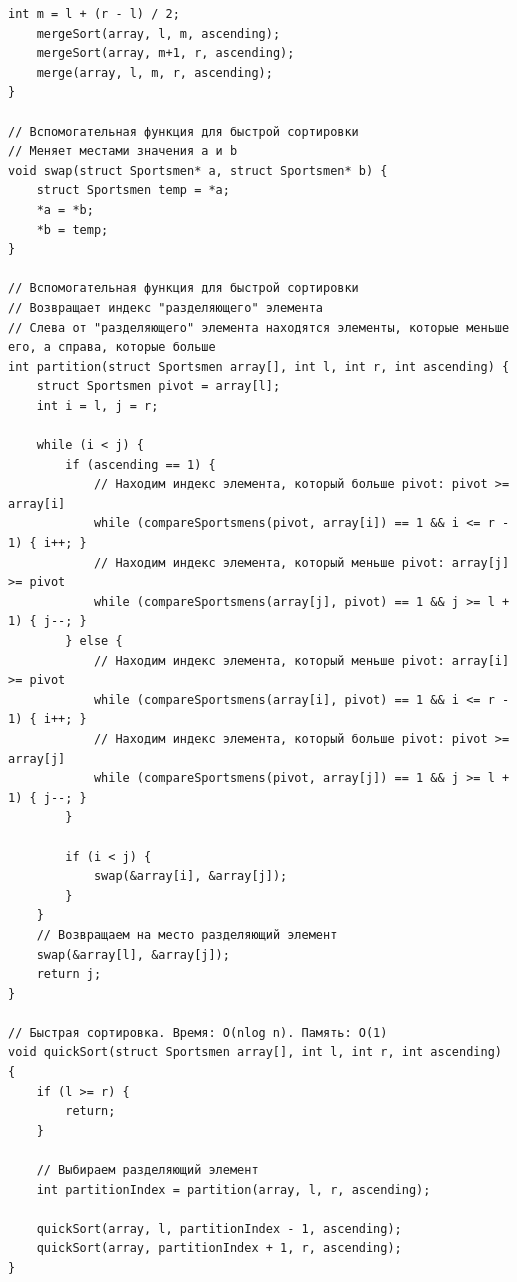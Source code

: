 \documentclass[12pt]{article}
\begin{document}
\begin{lstlisting}[label=sorting.c, caption=sorting.c]
    int m = l + (r - l) / 2;
    mergeSort(array, l, m, ascending);
    mergeSort(array, m+1, r, ascending);
    merge(array, l, m, r, ascending);
}

// Вспомогательная функция для быстрой сортировки
// Меняет местами значения a и b
void swap(struct Sportsmen* a, struct Sportsmen* b) {
    struct Sportsmen temp = *a;
    *a = *b;
    *b = temp;
}

// Вспомогательная функция для быстрой сортировки
// Возвращает индекс "разделяющего" элемента
// Слева от "разделяющего" элемента находятся элементы, которые меньше его, а справа, которые больше
int partition(struct Sportsmen array[], int l, int r, int ascending) {
    struct Sportsmen pivot = array[l];
    int i = l, j = r;

    while (i < j) {
        if (ascending == 1) {
            // Находим индекс элемента, который больше pivot: pivot >= array[i]
            while (compareSportsmens(pivot, array[i]) == 1 && i <= r - 1) { i++; }
            // Находим индекс элемента, который меньше pivot: array[j] >= pivot
            while (compareSportsmens(array[j], pivot) == 1 && j >= l + 1) { j--; }
        } else {
            // Находим индекс элемента, который меньше pivot: array[i] >= pivot
            while (compareSportsmens(array[i], pivot) == 1 && i <= r - 1) { i++; }
            // Находим индекс элемента, который больше pivot: pivot >= array[j]
            while (compareSportsmens(pivot, array[j]) == 1 && j >= l + 1) { j--; }
        }

        if (i < j) {
            swap(&array[i], &array[j]);
        }
    }
    // Возвращаем на место разделяющий элемент
    swap(&array[l], &array[j]);
    return j;
}

// Быстрая сортировка. Время: O(nlog n). Память: O(1)
void quickSort(struct Sportsmen array[], int l, int r, int ascending) {
    if (l >= r) {
        return;
    }

    // Выбираем разделяющий элемент
    int partitionIndex = partition(array, l, r, ascending);

    quickSort(array, l, partitionIndex - 1, ascending);
    quickSort(array, partitionIndex + 1, r, ascending);
}
\end{lstlisting} 

\newpage
\end{document}
